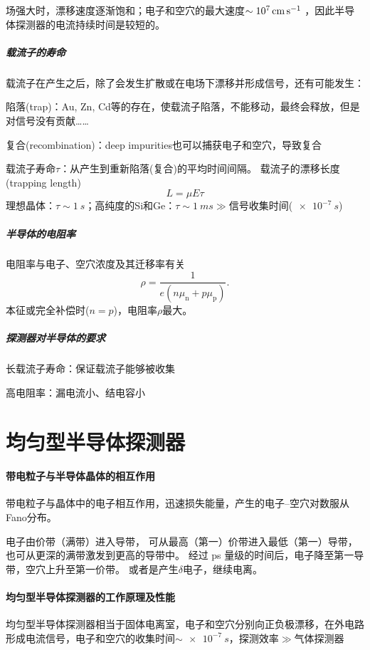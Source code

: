 场强大时，漂移速度逐渐饱和；电子和空穴的最大速度$\sim \qty{E7}{\centi\metre\per\second}$%
，因此半导体探测器的电流持续时间是较短的。
\subparagraph{载流子的寿命}
载流子在产生之后，除了会发生扩散或在电场下漂移并形成信号，还有可能发生：
\begin{compactitem}
	\item 陷落(trap)：Au, Zn, Cd等的存在，使载流子陷落，不能移动，最终会释放，但是对信号没有贡献……
	\item 复合(recombination)：deep impurities也可以捕获电子和空穴，导致复合%
\end{compactitem}
载流子寿命$\tau$：从产生到重新陷落(复合)的平均时间间隔。
载流子的漂移长度(trapping length)
\begin{equation}\label{eq:nrd-carrier-drift-length}
	L = \mu E\tau
\end{equation}
理想晶体：$\tau \sim \qty{1}{s}$；高纯度的Si和Ge：$\tau \sim \qty{1}{ms} \gg$信号收集时间($\qty{e-7}{s}$)
\subparagraph{半导体的电阻率}
电阻率与电子、空穴浓度及其迁移率有关
\begin{equation}\label{eq:nrd-semiconductor-resistivity}
	\rho = \frac1{e(n\mu_{\mathrm{n}} + p\mu_{\mathrm{p}})}.
\end{equation}
本征或完全补偿时($n = p$)，电阻率$\rho$最大。
\subparagraph{探测器对半导体的要求}
\begin{compactenum}
	\item 长载流子寿命：保证载流子能够被收集
	\item 高电阻率：漏电流小、结电容小
\end{compactenum}

\section{均匀型半导体探测器}

\paragraph{带电粒子与半导体晶体的相互作用}
带电粒子与晶体中的电子相互作用，迅速损失能量，产生的电子--空穴对数服从Fano分布。

电子由价带（满带）进入导带，
可从最高（第一）价带进入最低（第一）导带，
也可从更深的满带激发到更高的导带中。
经过 \unit{ps} 量级的时间后，电子降至第一导带，空穴上升至第一价带。
或者是产生$\delta$电子，继续电离。
\paragraph{均匀型半导体探测器的工作原理及性能}
均匀型半导体探测器相当于固体电离室，电子和空穴分别向正负极漂移，在外电路形成电流信号，电子和空穴的收集时间$\sim \qty{e-7}{s}$，探测效率$\gg$气体探测器

